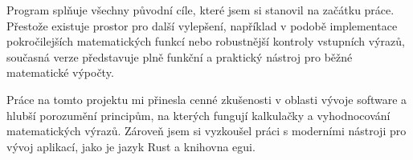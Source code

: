 \documentclass[12pt]{report}
\begin{document}
Program splňuje všechny původní cíle, které jsem si stanovil na začátku práce. Přestože existuje prostor pro další vylepšení, například v podobě implementace pokročilejších matematických funkcí nebo robustnější kontroly vstupních výrazů, současná verze představuje plně funkční a praktický nástroj pro běžné matematické výpočty.

Práce na tomto projektu mi přinesla cenné zkušenosti v oblasti vývoje software a hlubší porozumění principům, na kterých fungují kalkulačky a vyhodnocování matematických výrazů. Zároveň jsem si vyzkoušel práci s moderními nástroji pro vývoj aplikací, jako je jazyk Rust a knihovna egui.

\printbibliography

\listoffigures
\end{document}
